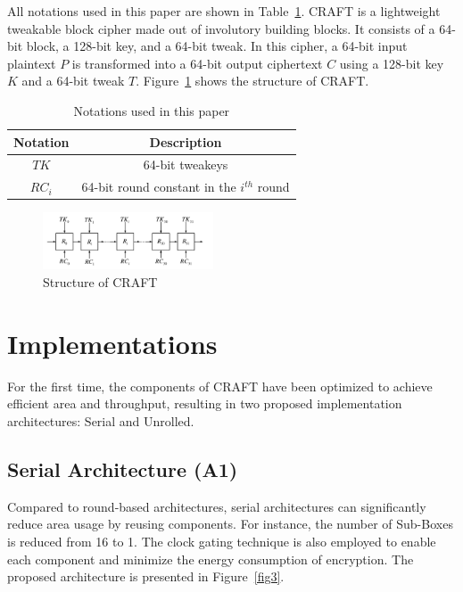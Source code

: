 \documentclass[final,5p,times,twocolumn]{elsarticle}
\begin{document}
All notations used in this paper are shown in Table~\ref{tab1}.
CRAFT is a lightweight tweakable block cipher made out of involutory building blocks.
It consists of a 64-bit block, a 128-bit key, and a 64-bit tweak. In this cipher, a 64-bit input plaintext $P$ is transformed into a 64-bit output ciphertext $C$ using a 128-bit key $K$ and a 64-bit tweak $T$. Figure~\ref{fig1} shows the structure of CRAFT.


\begin{table}[h]
    \centering
    \caption{Notations used in this paper}\label{tab1}%
    \begin{tabular}{|c|c|}
        \hline
        Notation & Description                                 \\
        \hline
        $TK$     & 64-bit tweakeys                             \\
        $RC_i$   & 64-bit round constant in the $i^{th}$ round \\
        \hline
    \end{tabular}
\end{table}

\begin{figure}[h]%
    \centering
    \includegraphics[width=0.45\textwidth]{./fig/struct-craft.pdf}
    \caption{Structure of CRAFT}\label{fig1}
\end{figure}

\section{Implementations}\label{sec3}

For the first time, the components of CRAFT have been optimized to achieve efficient area and throughput, resulting in two proposed implementation architectures: Serial and Unrolled.


\subsection{Serial Architecture (A1)}\label{subsec2}
Compared to round-based architectures, serial architectures can significantly reduce area usage by reusing components. For instance, the number of Sub-Boxes is reduced from 16 to 1. The clock gating technique is also employed to enable each component and minimize the energy consumption of encryption. The proposed architecture is presented in Figure~\ref{fig3}.
\end{document}
